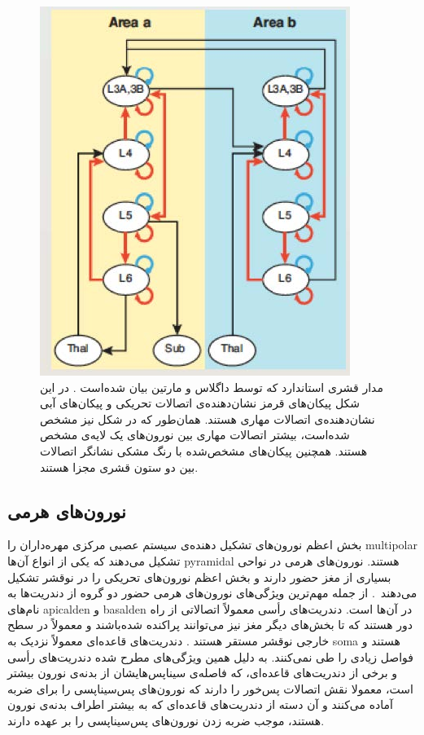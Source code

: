 \documentclass[12pt]{report}
\begin{document}
	\begin{figure}[]
		\centering
		\includegraphics[width=0.6\linewidth]{cc-con.jpg}
		\caption[NS]{
			مدار قشری استاندارد که توسط داگلاس و مارتین بیان شده‌است
			\cite{Douglas2004}.
			در این شکل پیکان‌های قرمز نشان‌دهنده‌ی اتصالات تحریکی و پیکان‌های آبی نشان‌دهنده‌ی اتصالات مهاری هستند. همان‌طور که در شکل نیز مشخص شده‌است، بیشتر اتصالات مهاری بین نورون‌های یک لایه‌ی مشخص هستند. همچنین پیکان‌های مشخص‌شده با رنگ مشکی نشانگر اتصالات بین دو ستون قشری مجزا هستند.
		}
		\label{fig:cc-doganmart}
	\end{figure}
	
	
	\subsection{نورون‌های هرمی}
	\label{subsection:pyramidal_neurons}
	
	بخش اعظم نورون‌های تشکیل دهنده‌ی سیستم عصبی مرکزی مهره‌داران را \gls{multipolar}  تشکیل می‌دهند \cite{Kandel2000} که یکی از انواع آن‌ها \gls{pyramidal} هستند. نورون‌های هرمی در نواحی بسیاری از مغز حضور دارند و بخش اعظم نورون‌های تحریکی را در نوقشر تشکیل می‌دهند~\cite{Hawkins2016}.
	از جمله مهم‌ترین ویژگی‌های نورون‌های هرمی حضور دو گروه از دندریت‌ها به نام‌های \gls{apicalden} و \gls{basalden} در آن‌ها است.
	دندریت‌های رأسی معمولاً اتصالاتی از راه دور هستند که تا بخش‌های دیگر مغز نیز می‌توانند پراکنده شده‌باشند و معمولاً در سطح خارجی نوقشر مستقر هستند \cite{MEGIAS2001527}. دندریت‌‌های قاعده‌ای معمولاً نزدیک به \gls{soma} هستند و فواصل زیادی را طی نمی‌کنند. به دلیل همین ویژگی‌های مطرح شده دندریت‌های رأسی و برخی از دندریت‌های قاعده‌ای، که فاصله‌ی سیناپس‌هایشان از بدنه‌ی نورون بیشتر است، معمولا نقش اتصالات پس‌خور را دارند که نورون‌های پس‌سیناپسی را برای ضربه آماده می‌کنند و آن دسته از دندریت‌های قاعده‌ای که به بیشتر اطراف بدنه‌ی نورون هستند، موجب ضربه زدن نورون‌های پس‌سیناپسی را بر عهده دارند.
	
\end{document}
